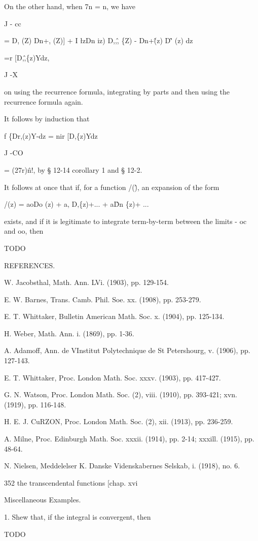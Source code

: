 On the other hand, when 7n = n, we have

J - cc

= D, (Z) Dn+, (Z)] + I \l zDn iz) D,,\^, \{Z) - Dn+\^ (z) D\^' (z) dz

=r [D,\^,\{z)Ydz,

J -X

on using the recurrence formula, integrating by parts and then using
the recurrence formula again.

It follows by induction that

f \{Dr,(z)Y-dz = nir [D,\{z)Ydz

J -CO

= (27r)\^n!, by § 12-14 corollary 1 and § 12-2.

It follows at once that if, for a function /(\^), an expansion of the
form

/(z) = aoDo (z) + a, D,\{z)+... + a\^Dn \{z)+ ...

exists, and if it is legitimate to integrate term-by-term between the
limits - oc and oo, then

TODO

REFERENCES.

W. Jacobsthal, Math. Ann. LVi. (1903), pp. 129-154.

E. W. Barnes, Trans. Camb. Phil. Soe. xx. (1908), pp. 253-279.

E. T. Whittaker, Bulletin American Math. Soc. x. (1904), pp. 125-134.

H. Weber, Math. Ann. i. (1869), pp. 1-36.

A. Adamoff, Ann. de VInstitut Polytechnique de St Petershourg, v.
(1906), pp. 127-143.

E. T. Whittaker, Proc. London Math. Soc. xxxv. (1903), pp. 417-427.

G. N. Watson, Proc. London Math. Soc. (2), viii. (1910), pp. 393-421;
xvn. (1919), pp. 116-148.

H. E. J. CuRZON, Proc. London Math. Soc. (2), xii. (1913), pp.
236-259.

A. Milne, Proc. Edinburgh Math. Soc. xxxii. (1914), pp. 2-14; xxxill.
(1915), pp. 48-64.

N. Nielsen, Meddelelser K. Danske Videnskabernes Selskab, i. (1918),
no. 6.

352 the transcendental functions [chap. xvi

Miscellaneous Examples.

1. Shew that, if the integral is convergent, then

TODO

